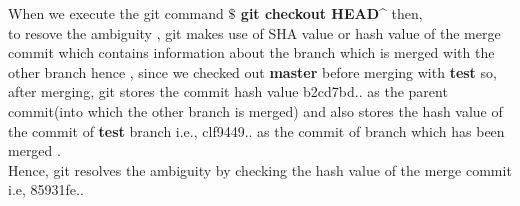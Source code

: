 \documentclass{article}
\theoremstyle{definition}
\begin{document}
When we execute the git command \textbf{$ \$ $ git checkout HEAD\^{}} then,\\
to resove the ambiguity , git makes use of SHA value or hash value of the merge commit which contains information about the branch which is merged with the other branch hence ,
since we checked out \textbf{ master} before merging with \textbf{test} so, after merging, git stores the commit hash value b2cd7bd.. as the parent commit(into which the other branch is merged) and also stores the hash value of the commit of \textbf{test} branch i.e., clf9449.. as the commit of branch which has been merged .\\
Hence, git resolves the ambiguity by checking the hash value of the merge commit i.e, 85931fe.. \\\\\\\\\\\\\\\\\\\\\\\\\\
\end{document}
